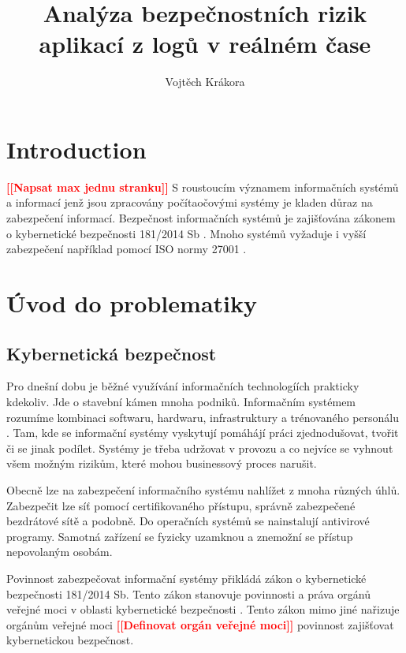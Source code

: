 \documentclass[thesis=M,czech]{FITthesis}[2012/10/20]
\title{Analýza bezpečnostních rizik aplikací z logů v reálném čase}
\author{Vojtěch Krákora} %
\newcommand{\todo}[1]{\textcolor{red}{\textbf{[[#1]]}}}
\newcommand{\blind}[1][1]{\textcolor{gray}{\Blindtext[#1][1]}}
\begin{document}

\chapter{Introduction}
\todo{Napsat max jednu stranku}
S roustoucím významem informačních systémů a informací jenž jsou zpracovány počítaočovými systémy je kladen důraz na zabezpečení informací. Bezpečnost informačních systémů je zajišťována zákonem o kybernetické bezpečnosti 181/2014 Sb \cite{zakon181-2014}. Mnoho systémů vyžaduje i vyšší zabezpečení například pomocí ISO normy 27001 \cite{iso27001}.

\blind[2]


\chapter{Úvod do problematiky}
	
	
	\section{Kybernetická bezpečnost}
		Pro dnešní dobu je běžné využívání informačních technologíích prakticky kdekoliv. Jde o stavební kámen mnoha podniků. Informačním systémem rozumíme kombinaci softwaru, hardwaru, infrastruktury a trénovaného personálu \cite{businessdictionary} .  Tam, kde  se informační systémy vyskytují pomáhájí práci zjednodušovat, tvořit či se jinak podílet. Systémy je třeba udržovat v provozu a co nejvíce se vyhnout všem možným rizikům, které mohou businessový proces narušit.
		
		Obecně lze na zabezpečení informačního systému nahlížet z mnoha různých úhlů. Zabezpečit lze síť pomocí certifikovaného přístupu, správně zabezpečené bezdrátové sítě a podobně. Do operačních systémů se nainstalují antivirové programy. Samotná zařízení se fyzicky uzamknou a znemožní se přístup nepovolaným osobám.
		
		Povinnost zabezpečovat informační systémy přikládá zákon o kybernetické bezpečnosti 181/2014 Sb. Tento zákon stanovuje povinnosti a práva orgánů veřejné moci v oblasti kybernetické bezpečnosti \cite{zakon181-2014}. Tento zákon mimo jiné nařizuje orgánům veřejné moci \todo{Definovat orgán veřejné moci} povinnost zajišťovat kybernetickou bezpečnost.
		
\end{document}
